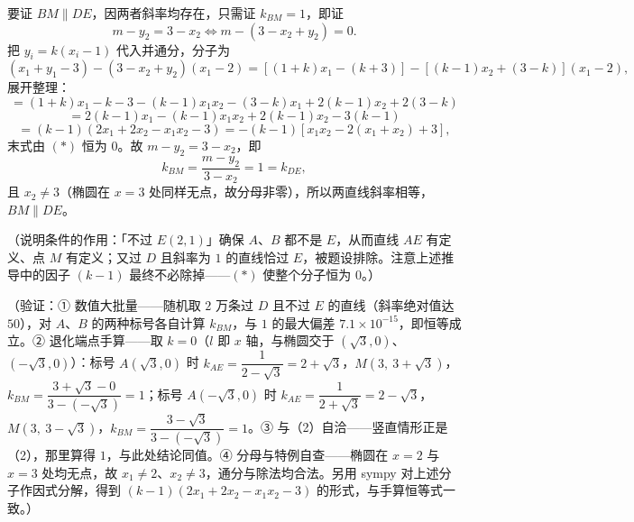 \begin{answer}
要证 \(BM\parallel DE\)，因两者斜率均存在，只需证 \(k_{BM}=1\)，即证
\nopagebreak[4]
\[
m-y_{2}=3-x_{2}\iff m-\left(3-x_{2}+y_{2}\right)=0 .
\]
把 \(y_{i}=k\left(x_{i}-1\right)\) 代入并通分，分子为
\nopagebreak[4]
\[
\left(x_{1}+y_{1}-3\right)-\left(3-x_{2}+y_{2}\right)\left(x_{1}-2\right)=\left[(1+k)x_{1}-(k+3)\right]-\left[(k-1)x_{2}+(3-k)\right]\left(x_{1}-2\right),
\]
展开整理：
\nopagebreak[4]
\[
=(1+k)x_{1}-k-3-(k-1)x_{1}x_{2}-(3-k)x_{1}+2(k-1)x_{2}+2(3-k)
\]
\nopagebreak[4]
\[
=2(k-1)x_{1}-(k-1)x_{1}x_{2}+2(k-1)x_{2}-3(k-1)
\]
\nopagebreak[4]
\[
=(k-1)\left(2x_{1}+2x_{2}-x_{1}x_{2}-3\right)=-(k-1)\left[x_{1}x_{2}-2\left(x_{1}+x_{2}\right)+3\right],
\]
末式由 \((\ast)\) 恒为 \(0\)。故 \(m-y_{2}=3-x_{2}\)，即
\nopagebreak[4]
\[
k_{BM}=\frac{m-y_{2}}{3-x_{2}}=1=k_{DE},
\]
且 \(x_{2}\neq3\)（椭圆在 \(x=3\) 处同样无点，故分母非零），所以两直线斜率相等，\(BM\parallel DE\)。

（说明条件的作用：「不过 \(E(2,1)\)」确保 \(A\)、\(B\) 都不是 \(E\)，从而直线 \(AE\) 有定义、点 \(M\) 有定义；又过 \(D\) 且斜率为 \(1\) 的直线恰过 \(E\)，被题设排除。注意上述推导中的因子 \((k-1)\) 最终不必除掉——\((\ast)\) 使整个分子恒为 \(0\)。）

（验证：① 数值大批量——随机取 \(2\) 万条过 \(D\) 且不过 \(E\) 的直线（斜率绝对值达 \(50\)），对 \(A\)、\(B\) 的两种标号各自计算 \(k_{BM}\)，与 \(1\) 的最大偏差 \(7.1\times10^{-15}\)，即恒等成立。② 退化端点手算——取 \(k=0\)（\(l\) 即 \(x\) 轴，与椭圆交于 \((\sqrt{3},0)\)、\((-\sqrt{3},0)\)）：标号 \(A(\sqrt{3},0)\) 时 \(k_{AE}=\dfrac{1}{2-\sqrt{3}}=2+\sqrt{3}\)，\(M(3,\ 3+\sqrt{3})\)，\(k_{BM}=\dfrac{3+\sqrt{3}-0}{3-(-\sqrt{3})}=1\)；标号 \(A(-\sqrt{3},0)\) 时 \(k_{AE}=\dfrac{1}{2+\sqrt{3}}=2-\sqrt{3}\)，\(M(3,\ 3-\sqrt{3})\)，\(k_{BM}=\dfrac{3-\sqrt{3}}{3-(-\sqrt{3})}=1\)。③ 与（2）自洽——竖直情形正是（2），那里算得 \(1\)，与此处结论同值。④ 分母与特例自查——椭圆在 \(x=2\) 与 \(x=3\) 处均无点，故 \(x_{1}\neq2\)、\(x_{2}\neq3\)，通分与除法均合法。另用 sympy 对上述分子作因式分解，得到 \((k-1)\left(2x_{1}+2x_{2}-x_{1}x_{2}-3\right)\) 的形式，与手算恒等式一致。）




\end{answer}